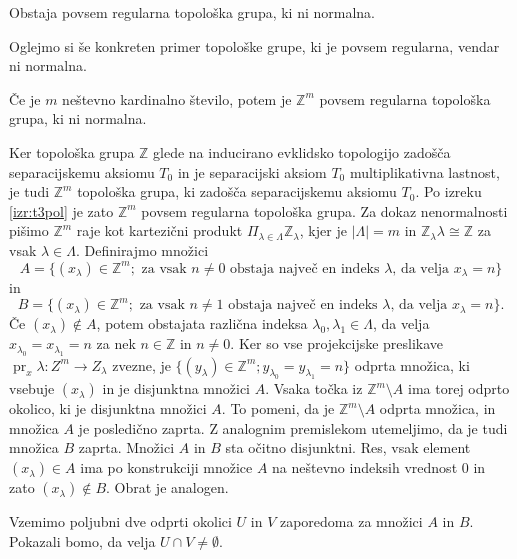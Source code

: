 \documentclass[mat1]{fmfdelo}
\newcommand{\Z}{\mathbb Z}
\DeclareMathOperator{\pr}{pr}
\begin{document}
\begin{izrek}
Obstaja povsem regularna topološka grupa, ki ni normalna.
\end{izrek}

Oglejmo si še konkreten primer topološke grupe, ki je povsem regularna, vendar ni normalna.

\begin{izrek}\label{izr:t4protiprimer}
	Če je $m$ neštevno kardinalno število, potem je $\Z^{m}$ povsem regularna topološka grupa, ki ni normalna.
\end{izrek}

\begin{dokaz}
Ker topološka grupa $\Z$ glede na inducirano evklidsko topologijo zadošča separacijskemu aksiomu $T_0$ in je separacijski aksiom $T_0$ multiplikativna lastnost, je tudi $\Z^m$ topološka grupa, ki zadošča separacijskemu aksiomu $T_0$. Po izreku \ref{izr:t3pol} je zato $\Z^m$ povsem regularna topološka grupa. Za dokaz nenormalnosti pišimo $\Z^m$ raje kot kartezični produkt $\Pi_{\lambda \in \Lambda}\Z_\lambda$, kjer je $|\Lambda| = m$ in $\Z_\lambda\lambda \cong \Z$ za vsak $\lambda \in \Lambda$. Definirajmo množici
\[ A = \lbrace (x_\lambda) \in \Z^m ; \text{ za vsak $n \neq 0$ obstaja največ en indeks $\lambda$, da velja $x_\lambda = n$}\rbrace \]
in
\[ B = \lbrace (x_\lambda) \in \Z^m ; \text{ za vsak $n \neq 1$ obstaja največ en indeks $\lambda$, da velja $x_\lambda = n$}\rbrace. \]
Če $(x_\lambda) \notin A$, potem obstajata različna indeksa $\lambda_0, \lambda_1 \in \Lambda$, da velja $x_{\lambda_0} = x_{\lambda_1} = n$ za nek $n \in \Z$ in $n \neq 0$. Ker so vse projekcijske preslikave $\pr_x\lambda\colon Z^m \to Z_\lambda$ zvezne, je $\lbrace (y_\lambda) \in \Z^m ; y_{\lambda_0} = y_{\lambda_1} = n \rbrace$ odprta množica, ki vsebuje $(x_\lambda)$ in je disjunktna množici $A$. Vsaka točka iz $\Z^m\setminus A$ ima torej odprto okolico, ki je disjunktna množici $A$. To pomeni, da je $\Z^m\setminus A$ odprta množica, in množica $A$ je posledično zaprta. Z analognim premislekom utemeljimo, da je tudi množica $B$ zaprta. Množici $A$ in $B$ sta očitno disjunktni. Res, vsak element $(x_\lambda) \in A$ ima po konstrukciji množice $A$ na neštevno indeksih vrednost $0$ in zato $(x_\lambda) \notin B$. Obrat je analogen.

Vzemimo poljubni dve odprti okolici $U$ in $V$ zaporedoma za množici $A$ in $B$. Pokazali bomo, da velja $U \cap V \neq \emptyset$.


\end{dokaz}
\end{document}
